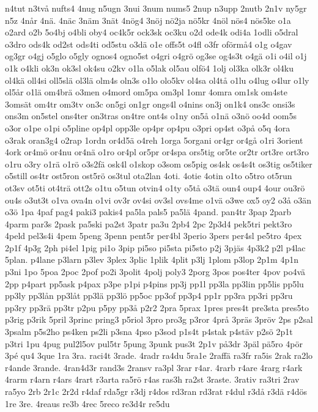 {n4tut
n3två
nufts4
4nug
n5ugn
3nui
3num
nums5
2nup
n3upp
2nutb
2n1v
ny5gr
n5z
4når
4nä.
4näc
3näm
3nät
4nög4
3nöj
nö2ja
nö5kr
4nöl
nös4
nös5ke
o1a
o2ard
o2b
5o4bj
o4bli
oby4
oc4k5r
ock3sk
oc3ku
o2d
ode4k
odi4a
1odli
o5dral
o3dro
ods4k
od2st
ods4ti
od5stu
o3dä
o1e
offs5t
o4fl
o3fr
oförmå4
o1g
o4gav
og3gr
o4gj
o5glo
o5gly
ognos4
ogno5st
o4gri
o4grö
og3se
og4s3t
o4gä
o1i
o4il
o1j
o1k
o4kli
ok3n
ok3sl
ok4su
o2kv
o1la
o5lak
ol5au
olfö4
1olj
ol3ka
olk3r
ol4ku
ol4kä
oll4si
oll5slä
ol3lä
olm4s
oln3s
o1lo
olo5kv
ol4sa
ol4tå
o1lu
o4lug
o4lur
o1ly
ol5år
o1lä
om4brä
o3men
o4mord
om5pa
om3pl
1omr
4omra
om1sk
om4ste
3omsät
om4tr
om3tv
on3c
on5gi
on1gr
ongs4l
o4nins
on3j
on1k4
ons3c
onsi3s
ons3m
on5stel
ons4ter
on3tras
on4tre
ont4s
o1ny
on5å
o1nä
o3nö
oo4d
oom5s
o3or
o1pe
o1pi
o5pline
op4pl
opp3le
op4pr
op4pu
o3pri
op4st
o3på
o5q
4ora
o3rak
oran3g4
o2rap
1ordn
or4d5ä
o4reh
1orga
5organi
or4gr
or4gå
o1ri
3orient
4ork
or4mö
or4nu
or4nä
o1ro
or4pl
or5pr
or4spa
ors5tig
or5te
or2tr
ort3re
ort3ro
o1ru
o3ry
o1rä
o1rö
o3s2fä
osk4l
o1skop
o3som
os5pig
os4sk
os4s4t
os3tig
os5tiker
o5still
os4tr
ost5ron
ost5rö
os3tul
ota2lan
4oti.
4otie
4otin
o1to
o5tro
ot5run
ot3sv
ot5ti
ot4trä
ott2s
o1tu
o5tun
otvin4
o1ty
o5tå
o3tä
oun4
oup4
4our
ou3rö
ou4s
o3ut3t
o1va
ova4n
o1vi
ov3r
ov4si
ov3sl
ovs4me
o1vä
o3we
ox5
oy2
o3å
o3än
o3ö
1pa
4paf
pag4
paki3
pakis4
pa5la
pals5
pa5lä
4pand.
pan4tr
3pap
2parb
4parm
par3s
2pask
pa5ski
pa2st
3patr
pa3u
2pb4
2pc
2p3d4
pek5tri
pekt3ro
4peld
pel3s4i
4pem
5peng
3penn
pent5r
per4bl
3perio
3pers
per4sl
pe5tro
4pex
2p1f
4p3g
2ph
pi4el
1pig
pi1o
3pip
pi5so
pi5sta
pi5sto
p2j
3pjäs
4p3k2
p2l
p4lac
5plan.
p4lane
p3larn
p3lev
3plex
3plic
1plik
4plit
p3lj
1plom
p3lop
2p1m
4p1n
p3ni
1po
5poa
2poc
2pof
po2i
3polit
4polj
poly3
2porg
3pos
pos4ter
4pov
po4vä
2pp
p4part
pp5ask
p4pax
p3pe
p1pi
p4pins
pp3j
pp1l
pp3la
pp3lin
pp5lis
pp5lu
pp3ly
pp3lån
pp3låt
pp3lä
pp3lö
pp5oc
pp3of
pp3p4
pp1r
pp3ra
pp3ri
pp3ru
pp3ry
pp3rä
pp3tr
p2pu
p5py
pp3å
p2r2
2pra
5prax
1pres
pres4t
pre3sta
pres5to
p3rig
p3rik
5pril
3princ
pring3
p5riol
3pro
pro3g
p3ror
4prå
3präs
3pröv
2ps
p2sal
3psalm
p5s2ho
ps4ken
ps2li
p3sna
4pso
p3sod
p1s4t
p4stak
p4stäv
p2sö
2p1t
p3tri
1pu
4pug
pul2l5ov
pul5tr
5pung
3punk
pus3t
2p1v
på3dr
3päl
pä5ro
4pör
3pé
qu4
3que
1ra
3ra.
raci4t
3rade.
4radr
ra4du
5ra1e
2raffä
ra3fr
ra5is
2rak
ra2lo
r4ande
3rande.
4ran4d3r
rand3s
2ransv
ra3pl
3rar
r4ar.
4rarb
r4are
4rarg
r4ark
4rarm
r4arn
r4ars
4rart
r3arta
ra5rö
r4as
ras3h
ra2st
3raste.
3rativ
ra3tri
2rav
ra5yo
2rb
2r1c
2r2d
r4daf
rda5gr
r3dj
r4dos
rd3ran
rd3rat
r4dul
r3då
r3dä
r4dös
1re
3re.
4reaus
re3b
4rec
5reco
re3d4r
re5du
}
